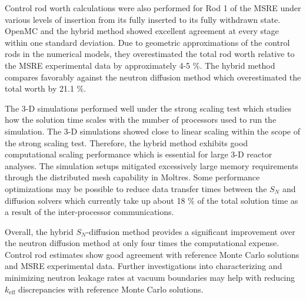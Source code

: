 Control rod worth calculations were also performed for Rod 1 of the \gls{MSRE} under various levels
of insertion from its fully inserted to its fully withdrawn state. OpenMC and the hybrid method
showed excellent agreement at every stage within one standard deviation. Due to geometric
approximations of the control rods in the numerical models, they overestimated the total
rod worth relative to the \gls{MSRE} experimental data by approximately 4-5 \%. The hybrid method
compares favorably against the neutron diffusion method which overestimated the total worth by
21.1 \%.

The 3-D simulations performed well under the strong scaling test which studies how the solution
time scales with the number of processors used to run the simulation. The 3-D simulations showed
close to linear scaling within the scope of the strong scaling test. Therefore, the hybrid method
exhibits good computational scaling performance which is essential for large 3-D reactor analyses.
The simulation setups mitigated excessively large memory requirements through the distributed mesh
capability in Moltres. Some performance optimizations may be possible to reduce data transfer times
between the $S_N$ and diffusion solvers which currently take up about 18 \% of the total solution
time as a result of the inter-processor communications.

Overall, the hybrid $S_N$-diffusion method provides a significant improvement over the neutron
diffusion method at only four times the computational expense. Control rod estimates
show good agreement with reference Monte Carlo solutions and \gls{MSRE} experimental data.
Further investigations into characterizing and minimizing neutron leakage rates at vacuum
boundaries may help with reducing $k_\text{eff}$ discrepancies with reference Monte Carlo
solutions.
